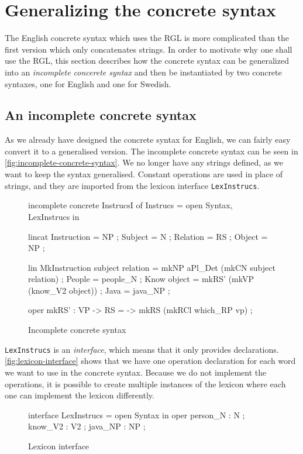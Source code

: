 \section{Generalizing the concrete syntax}

The English concrete syntax which uses the RGL is more complicated than the first version which only concatenates strings. In order to motivate why one shall use the RGL, this section describes how the concrete syntax can be generalized into an \emph{incomplete concerete syntax} and then be instantiated by two concrete syntaxes, one for English and one for Swedish.

\subsection*{An incomplete concrete syntax}

As we already have designed the concrete syntax for English, we can fairly easy convert it to a generalised version. The incomplete concrete syntax can be seen in \autoref{fig:incomplete-concrete-syntax}. We no longer have any strings defined, as we want to keep the syntax generalised. Constant operations are used in place of strings, and they are imported from the lexicon interface  \texttt{LexInstrucs}.

\begin{figure}[h]
\begin{code}
incomplete concrete InstrucsI of Instrucs = open Syntax, LexInstrucs in {
  lincat
    Instruction = NP ;
    Subject = N ;
    Relation = RS ;
    Object = NP ;

  lin
    MkInstruction subject relation = mkNP aPl_Det (mkCN subject relation) ;
    People = people_N ;
    Know object = mkRS' (mkVP (know_V2 object)) ;
    Java = java_NP ;
    
   oper
      mkRS' : VP -> RS = \vp -> mkRS (mkRCl which_RP vp) ;
}
\end{code}
\caption{Incomplete concrete syntax\label{fig:incomplete-concrete-syntax}}
\end{figure}

\texttt{LexInstrucs} is an \emph{interface}, which means that it only provides declarations. \autoref{fig:lexicon-interface} shows that we have one operation declaration for each word we want to use in the concrete syntax. Because we do not implement the operations, it is possible to create multiple instances of the lexicon where each one can implement the lexicon differently.

\begin{figure}[H]
\begin{code}
interface LexInstrucs = open Syntax in {
   oper
     person_N : N ;
     know_V2 : V2 ;
     java_NP : NP ;
}
\end{code}
\caption{Lexicon interface\label{fig:lexicon-interface}}
\end{figure}


